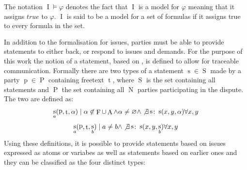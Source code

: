\documentclass[12pt,msc,a4paper,oneside]{ucl_thesis}
\DeclareMathOperator{\Propatom}{A}
\DeclareMathOperator{\Propvar}{F}
\DeclareMathOperator{\Interpretation}{I}
\DeclareMathOperator{\Statement}{S}
\DeclareMathOperator{\statement}{s}
\DeclareMathOperator{\statementtext}{t}
\DeclareMathOperator{\Party}{P}
\DeclareMathOperator{\party}{p}
\DeclareMathOperator{\Numparties}{N}
\begin{document}
\begin{itemize}
        The notation $\Interpretation\models\varphi$ denotes the fact that $\Interpretation$ is a model for $\varphi$ meaning that it assigns $true$ to $\varphi$. $\Interpretation$ is said to be a model for a set of formulas if it assigns true to every formula in the set.
\end{itemize}
In addition to the formalisation for issues, parties must be able to provide statements to either back, or respond to issues and demands. For the purpose of this work the notion of a statement, based on \cite{Bellucci:2004:IAI:1032651.1033678}, is defined to allow for traceable communication. Formally there are two types of a statement $\statement \in \Statement$ made by a party $\party \in \Party$ containing freetext $\statementtext$, where $\Statement$ is the set containing all statements and $\Party$ the set containing all $\Numparties$ parties participating in the dispute. The two are defined as:
\begin{equation}
    \statement_a(\party, \statementtext, \alpha) \mid \alpha \not\in \Propvar \cup \Propatom \wedge \alpha \neq \varnothing \wedge \not\exists \statement \colon \statement(x, y, \alpha) \forall x,y
    \label{eq:initial_statement}
\end{equation}
\begin{equation}
    \statement_a(\party, \statementtext, \statement_b) \mid a \neq b \wedge \not\exists \statement \colon \statement(x, y, \statement_b) \forall x,y
    \label{eq:initial_statement_s}
\end{equation}
Using these definitions, it is possible to provide statements based on issues expressed as atoms or variabes as well as statements based on earlier ones and they can be classified as the four distinct types:
\end{document}
